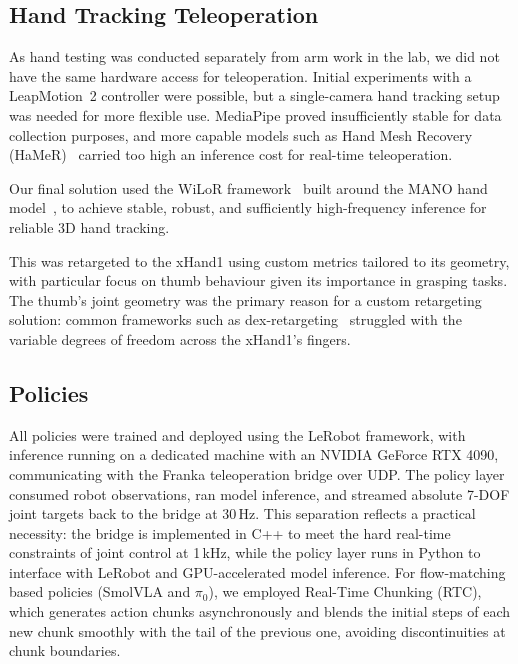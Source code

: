 \documentclass[conference]{IEEEtran}
\begin{document}
\subsection{Hand Tracking Teleoperation} 

As hand testing was conducted separately from arm work in the lab, we did not have the same hardware access for teleoperation. Initial experiments with a LeapMotion~2 controller were possible, but a single-camera hand tracking setup was needed for more flexible use. MediaPipe proved insufficiently stable for data collection purposes, and more capable models such as Hand Mesh Recovery (HaMeR)~\cite{pavlakos2023reconstructinghands3dtransformers} carried too high an inference cost for real-time teleoperation.

Our final solution used the WiLoR framework~\cite{potamias2024wilorendtoend3dhand} built around the MANO hand model~\cite{MANO:SIGGRAPHASIA:2017}, to achieve stable, robust, and sufficiently high-frequency inference for reliable 3D hand tracking.

This was retargeted to the xHand1 using custom metrics tailored to its geometry, with particular focus on thumb behaviour given its importance in grasping tasks. The thumb's joint geometry was the primary reason for a custom retargeting solution: common frameworks such as dex-retargeting~\cite{qin2023anyteleopgeneralvisionbased} struggled with the variable degrees of freedom across the xHand1's fingers.

\subsection{Policies}

All policies were trained and deployed using the LeRobot framework, with inference running on a dedicated machine with an NVIDIA GeForce RTX 4090, communicating with the Franka teleoperation bridge over UDP. The policy layer consumed robot observations, ran model inference, and streamed absolute 7-DOF joint targets back to the bridge at 30\,Hz. This separation reflects a practical necessity: the bridge is implemented in C++ to meet the hard real-time constraints of joint control at 1\,kHz, while the policy layer runs in Python to interface with LeRobot and GPU-accelerated model inference. For flow-matching based policies (SmolVLA and $\pi_0$), we employed Real-Time Chunking (RTC), which generates action chunks asynchronously and blends the initial steps of each new chunk smoothly with the tail of the previous one, avoiding discontinuities at chunk boundaries.
\end{document}

